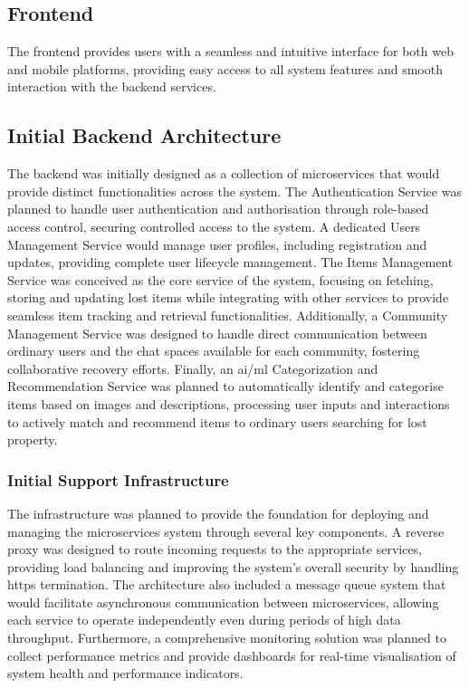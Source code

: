\subsection{Frontend}

The frontend provides users with a seamless and intuitive interface for both web and mobile platforms, providing easy access to all system features and smooth interaction with the backend services.

\subsection{Initial Backend Architecture}

The backend was initially designed as a collection of microservices that would provide distinct functionalities across the system. The Authentication Service was planned to handle user authentication and authorisation through role-based access control, securing controlled access to the system. A dedicated Users Management Service would manage user profiles, including registration and updates, providing complete user lifecycle management. The Items Management Service was conceived as the core service of the system, focusing on fetching, storing and updating lost items while integrating with other services to provide seamless item tracking and retrieval functionalities. Additionally, a Community Management Service was designed to handle direct communication between ordinary users and the chat spaces available for each community, fostering collaborative recovery efforts. Finally, an \ac{ai}/\ac{ml} Categorization and Recommendation Service was planned to automatically identify and categorise items based on images and descriptions, processing user inputs and interactions to actively match and recommend items to ordinary users searching for lost property.

\subsubsection{Initial Support Infrastructure}

The infrastructure was planned to provide the foundation for deploying and managing the microservices system through several key components. A reverse proxy was designed to route incoming requests to the appropriate services, providing load balancing and improving the system's overall security by handling \ac{https} termination. The architecture also included a message queue system that would facilitate asynchronous communication between microservices, allowing each service to operate independently even during periods of high data throughput. Furthermore, a comprehensive monitoring solution was planned to collect performance metrics and provide dashboards for real-time visualisation of system health and performance indicators.

